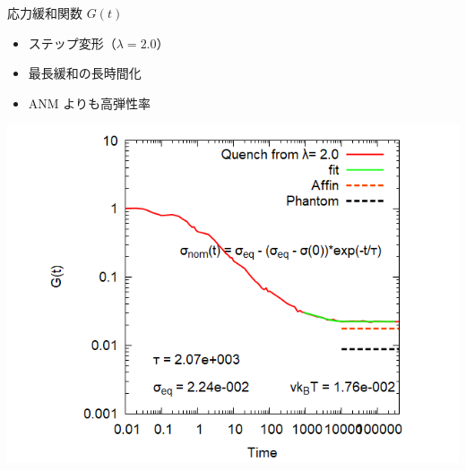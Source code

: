 \documentclass[12pt, dvipdfmx]{beamer}
\begin{document}
\begin{frame}
\begin{columns}[T, onlytextwidth]
				\begin{block}{応力緩和関数 $G(t)$}
					\begin{itemize}
						\item ステップ変形（$\lambda=2.0$）
						\item 最長緩和の長時間化
						\item ANM よりも高弾性率
					\end{itemize}
					\includegraphics[width=\textwidth]{gt_N48_C4_M3.png}
				\end{block}
		\end{columns}
\end{frame}
\end{document}
